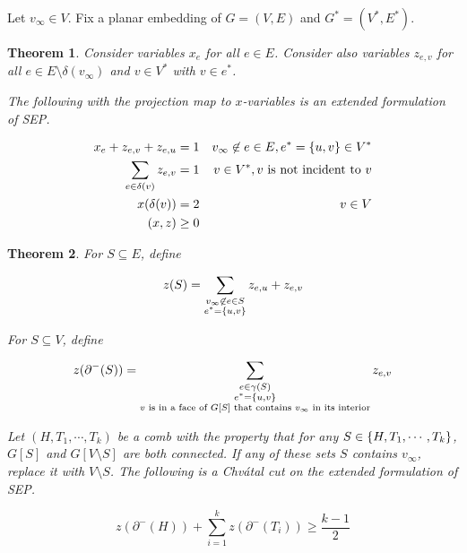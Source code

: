 \documentclass{memoir}
\theoremstyle{plain}
\newtheorem{theorem}{Theorem}
\theoremstyle{definition}
\begin{document}
Let $v_\infty \in V$.
Fix a planar embedding of $G=(V,E)$ and $G^* = (V^*, E^*)$.

\begin{theorem}
Consider variables $x_e$ for all $e\in E$. 
Consider also variables $z_{e,v}$ for all $e\in E\setminus\delta(v_\infty)$
and $v\in V^*$ with $v\in e^*$.

The following with the projection map to $x$-variables is an extended formulation of SEP.

\begin{align}
x_e + z_{e,v}+z_{e,u} &= 1 & v_\infty \not\in e \in E, e^* = \cbr{u,v} \in V^* \label{oneuse} \\
\sum_{e\in\delta(v)} z_{e,v} &= 1 & v\in V^*, \text{$v$ is not incident to $v$} \label{facedegree} \\
x(\delta(v)) &= 2 & v\in V \label{vertexdegree} \\
(x,z) &\geq 0
\end{align}
\end{theorem}


\begin{theorem}
For $S\subseteq E$, define

$$z(S) = \sum_{\substack{v_\infty\not\in e\in S \\ e^* = \cbr{u,v}}} z_{e,u} + z_{e,v}$$

For $S\subseteq V$, define 

$$z(\partial^-(S)) = \sum_{\substack{e \in \gamma(S) \\ e^* = \cbr{u,v} \\ \text{$v$ is in a face of $G[S]$ that contains $v_\infty$ in its interior}}} z_{e,v}$$


Let $(H, T_1, \cdots, T_k)$ be a comb with the property that for any $S\in\cbr{H, T_1,\cdots, T_k}$, $G[S]$ and $G[V\setminus S]$ are both connected. If any of these sets $S$ contains $v_\infty$,
replace it with $V\setminus S$.
The following is a Chv\'{a}tal cut on the extended formulation of SEP.

$$z(\partial^-(H)) +  \sum_{i=1}^k z(\partial^-(T_i)) \geq \frac{k-1}{2}$$



\end{theorem}
\end{document}
